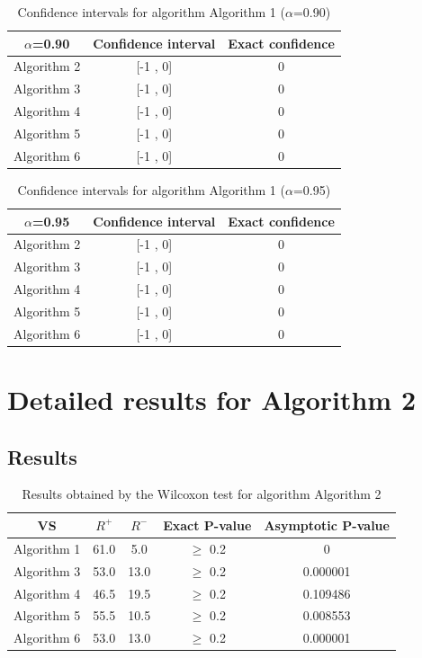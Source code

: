 \documentclass[a4paper,10pt]{article}
\begin{document}
\begin{table}[!htp]
\centering\small
\begin{tabular}{
|c|c|c|}
\hline
 $\alpha$=0.90 & Confidence interval & Exact confidence \\ \hline 
Algorithm 2 & [-1 , 0] & 0\\ \hline 
Algorithm 3 & [-1 , 0] & 0\\ \hline 
Algorithm 4 & [-1 , 0] & 0\\ \hline 
Algorithm 5 & [-1 , 0] & 0\\ \hline 
Algorithm 6 & [-1 , 0] & 0\\ \hline 

\end{tabular}
\caption{Confidence intervals for algorithm Algorithm 1 ($\alpha$=0.90)}
\end{table}
\begin{table}[!htp]
\centering\small
\begin{tabular}{
|c|c|c|}
\hline
 $\alpha$=0.95 & Confidence interval & Exact confidence \\ \hline 
Algorithm 2 & [-1 , 0] & 0\\ \hline 
Algorithm 3 & [-1 , 0] & 0\\ \hline 
Algorithm 4 & [-1 , 0] & 0\\ \hline 
Algorithm 5 & [-1 , 0] & 0\\ \hline 
Algorithm 6 & [-1 , 0] & 0\\ \hline 

\end{tabular}
\caption{Confidence intervals for algorithm Algorithm 1 ($\alpha$=0.95)}
\end{table}

 \clearpage 


\section{Detailed results for Algorithm 2}


\subsection{Results}

\begin{table}[!htp]
\centering\small
\begin{tabular}{
|c|c|c|c|c|}
\hline
 VS & $R^{+}$ & $R^{-}$ & Exact P-value & Asymptotic P-value \\ \hline 
Algorithm 1 & 61.0 & 5.0 & $\geq$ 0.2 & 0\\ \hline 
Algorithm 3 & 53.0 & 13.0 & $\geq$ 0.2 & 0.000001\\ \hline 
Algorithm 4 & 46.5 & 19.5 & $\geq$ 0.2 & 0.109486\\ \hline 
Algorithm 5 & 55.5 & 10.5 & $\geq$ 0.2 & 0.008553\\ \hline 
Algorithm 6 & 53.0 & 13.0 & $\geq$ 0.2 & 0.000001\\ \hline 

\end{tabular}
\caption{Results obtained by the Wilcoxon test for algorithm Algorithm 2}
\end{table}
\end{document}
